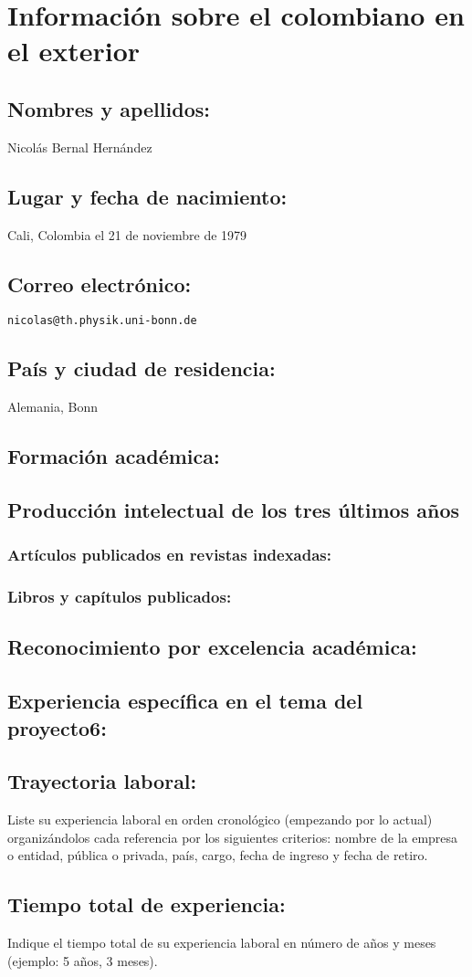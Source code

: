\section{Información sobre el colombiano en el exterior}
\subsection{Nombres y apellidos: }
Nicolás Bernal Hernández
\subsection{Lugar y fecha de nacimiento: }
Cali, Colombia el  21 de noviembre de 1979
\subsection{Correo electrónico: }
\texttt{nicolas@th.physik.uni-bonn.de}
\subsection{País y ciudad de residencia: }
Alemania, Bonn
\subsection{Formación académica:}
\subsection{Producción intelectual de los tres últimos años}
\subsubsection{Artículos publicados en revistas indexadas:}
\subsubsection{Libros y capítulos publicados:}
\subsection{Reconocimiento por excelencia académica:}
\subsection{Experiencia específica en el tema del proyecto6:}
\subsection{Trayectoria laboral:}
\begin{instrucciones}
  Liste su experiencia laboral en orden cronológico (empezando por lo
  actual) organizándolos cada referencia por los siguientes criterios:
  nombre de la empresa o entidad, pública o privada, país, cargo,
  fecha de ingreso y fecha de retiro.
\end{instrucciones}
\subsection{Tiempo total de experiencia:}
\begin{instrucciones}
  Indique el tiempo total de su experiencia laboral en número de años
  y meses (ejemplo: 5 años, 3 meses).
\end{instrucciones}


